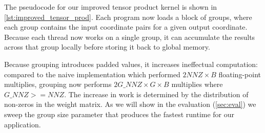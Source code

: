 The pseudocode for our improved tensor product kernel is shown in \autoref{lst:improved_tensor_prod}. Each program now loads a block of groups, where each group contains the input coordinate pairs for a given output coordinate. Because each thread now works on a single group, it can accumulate the results across that group locally before storing it back to global memory.

Because grouping introduces padded values, it increases ineffectual computation: compared to the naive implementation which performed $2NNZ \times B$ floating-point multiplies,
grouping now performs $2G\_NNZ \times G \times B$ multiplies where $G\_NNZ >= NNZ$.
The increase in work is determined by the distribution of non-zeros in the weight matrix.
As we will show in the evaluation (\autoref{sec:eval})
we sweep the group size parameter that produces the fastest runtime for our application.


